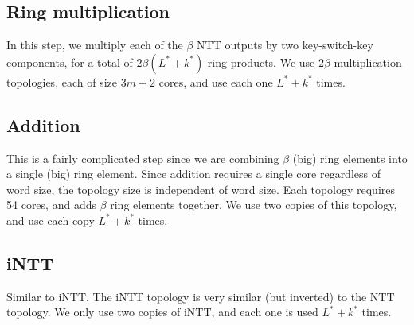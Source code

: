 \documentclass[../../fheimpl.tex]{subfiles}
\begin{document}
\subsection{Ring multiplication}
In this step, we multiply each of the $\beta$ NTT outputs by two key-switch-key components, for a total of $2\beta(L^*+k^*)$ ring products. We use $2\beta$ multiplication topologies, each of size $3m+2$ cores, and use each one $L^*+k^*$ times.

\subsection{Addition}
This is a fairly complicated step since we are combining $\beta$ (big) ring elements into a single (big) ring element. Since addition requires a single core regardless of word size, the topology size is independent of word size. Each topology requires 54 cores, and adds $\beta$ ring elements together. We use two copies of this topology, and use each copy $L^*+k^*$ times.

\subsection{iNTT}
Similar to iNTT. The iNTT topology is very similar (but inverted) to the NTT topology. We only use two copies of iNTT, and each one is used $L^*+k^*$ times.
\end{document}
